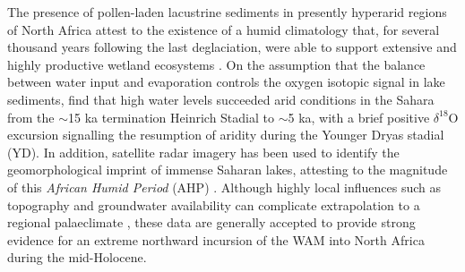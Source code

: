 \documentclass[a4paper]{article}
\newcommand{\delO}{\ensuremath{\delta ^{18}}O}
\begin{document}

The presence of pollen-laden lacustrine sediments in presently hyperarid regions of North Africa attest to the existence of a humid climatology that, for several thousand years following the last deglaciation, were able to support extensive and highly productive wetland ecosystems \parencite{ritchie1985sediment, lezine1990across}.
On the assumption that the balance between water input and evaporation controls the oxygen isotopic signal in lake sediments, \cite{gasse1990arid} find that high water levels succeeded arid conditions in the Sahara from the $\sim$15 ka termination Heinrich Stadial to $\sim$5 ka, with a brief positive \delO{} excursion signalling the resumption of aridity during the Younger Dryas stadial (YD).
In addition, satellite radar imagery has been used to identify the geomorphological imprint of immense Saharan lakes, attesting to the magnitude of this \emph{African Humid Period} (AHP) \parencite{schuster2005holocene, drake2006shorelines}.
Although highly local influences such as topography and groundwater availability can complicate extrapolation to a regional palaeclimate \parencite{baumhauer1991palaeolakes}, these data are generally accepted to provide strong evidence for an extreme northward incursion of the WAM into North Africa during the mid-Holocene.

\printbibliography{}
\end{document}
